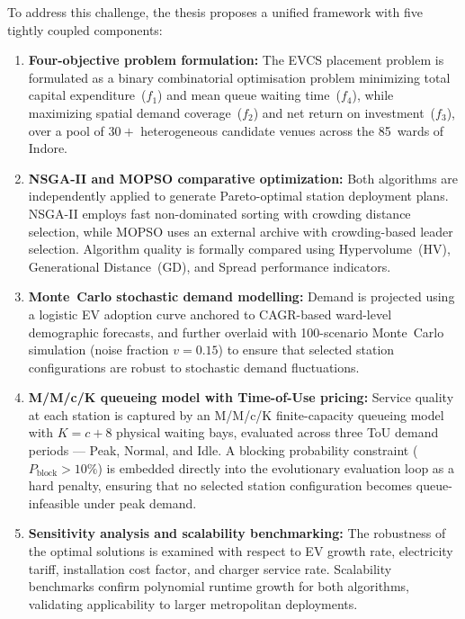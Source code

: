 To address this challenge, the thesis proposes a unified framework with
five tightly coupled components:
\begin{enumerate}
  \item \textbf{Four-objective problem formulation:} The EVCS placement
        problem is formulated as a binary combinatorial optimisation problem
        minimizing total capital expenditure~($f_1$) and mean queue waiting
        time~($f_4$), while maximizing spatial demand coverage~($f_2$) and
        net return on investment~($f_3$), over a pool of $30+$ heterogeneous
        candidate venues across the 85~wards of Indore.

  \item \textbf{NSGA-II and MOPSO comparative optimization:} Both
        algorithms are independently applied to generate Pareto-optimal
        station deployment plans. NSGA-II employs fast non-dominated sorting
        with crowding distance selection, while MOPSO uses an external archive
        with crowding-based leader selection. Algorithm quality is formally
        compared using Hypervolume~(HV), Generational Distance~(GD), and
        Spread performance indicators.

  \item \textbf{Monte~Carlo stochastic demand modelling:} Demand is
        projected using a logistic EV adoption curve anchored to CAGR-based
        ward-level demographic forecasts, and further overlaid with
        100-scenario Monte~Carlo simulation (noise fraction $v = 0.15$) to
        ensure that selected station configurations are robust to stochastic
        demand fluctuations.

  \item \textbf{M/M/c/K queueing model with Time-of-Use pricing:}
        Service quality at each station is captured by an M/M/c/K
        finite-capacity queueing model with $K = c + 8$ physical waiting
        bays, evaluated across three ToU demand periods --- Peak, Normal,
        and Idle. A blocking probability constraint ($P_{\text{block}} > 10\%$)
        is embedded directly into the evolutionary evaluation loop as a
        hard penalty, ensuring that no selected station configuration
        becomes queue-infeasible under peak demand.

  \item \textbf{Sensitivity analysis and scalability benchmarking:}
        The robustness of the optimal solutions is examined with respect
        to EV growth rate, electricity tariff, installation cost factor,
        and charger service rate. Scalability benchmarks confirm polynomial
        runtime growth for both algorithms, validating applicability to
        larger metropolitan deployments.
\end{enumerate}

